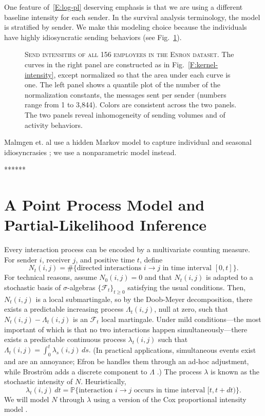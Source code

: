\documentclass[aoas,preprint]{imsart}
\begin{document}
One feature of~\eqref{E:log-pl} deserving emphasis is that we are using
a different baseline intensity for each sender. In the survival analysis
terminology, the model is stratified by sender. We make this modeling
choice because the individuals have highly idiosyncratic sending behaviors
(see Fig.~\ref{F:send-intensities}).
\begin{figure}
    \caption{
        \textsc{Send intensities of all 156 employees in the Enron
        dataset.}  The curves in the right panel are constructed as in
        Fig.~\ref{F:kernel-intensity}, except normalized so that the
        area under each curve is one.   The left panel shows a quantile plot
        of the number of the normalization constants,
        the messages sent per sender (numbers range from 1 to 3,844).
        Colors are consistent across the two panels.
        The two panels reveal inhomogeneity of sending volumes and of
        activity behaviors.
    }
    \label{F:send-intensities}
\end{figure}
Malmgen et. al use a hidden Markov
model to capture individual and seasonal idiosyncrasies
\cite{malmgen2009characterizing}; we use a nonparametric model instead.

******

\section{A Point Process Model and Partial-Likelihood Inference}\label{S:point-process-model}

Every interaction process can be encoded by a multivariate counting measure.
For sender $i$, receiver $j$, and positive time $t$, define
\[
    N_t(i,j)
        =
        \#\{
            \text{directed interactions $i\rightarrow j$ in time interval 
            $[0,t]$}
        \}.
\]
For technical reasons, assume $N_0(i,j) = 0$ and that $N_t(i,j)$ is adapted to 
a stochastic basis of $\sigma$-algebras $\{ \mathcal{F}_t \}_{t \geq 0}$
satisfying the usual  conditions.  Then, $N_t(i,j)$ is a 
local submartingale, so by the Doob-Meyer decomposition, there exists a 
predictable increasing process $\Lambda_t(i,j)$, null at zero, such that $N_t(i,j) - \Lambda_t(i,j)$ is an $\mathcal{F}_t$ local martingale.  Under mild conditions---the most important of which is that no two 
interactions happen simultaneously---there exists a predictable continuous 
process $\lambda_t(i,j)$ such that
\(
    \Lambda_t(i,j) = \int_0^t \lambda_s(i,j) \, ds.
\)
(In practical applications, simultaneous events exist and are an annoyance;
Efron be handles them through an ad-hoc adjustment, while Brostr\"om adds a 
discrete component to $\Lambda$ \cite{efron1977efficiency,brostrom2002cox}.)
The process $\lambda$ is known as the stochastic intensity of $N$.
Heuristically,
\[
    \lambda_t(i,j) \, dt
        =
        \mathbb{P}\{
            \text{interaction $i\rightarrow j$ occurs in time interval $[t,t+dt)$}
        \}.
\]
We will model $N$ through $\lambda$ using a version of the Cox
proportional intensity model \cite{cox1972regression}.  
\end{document}
